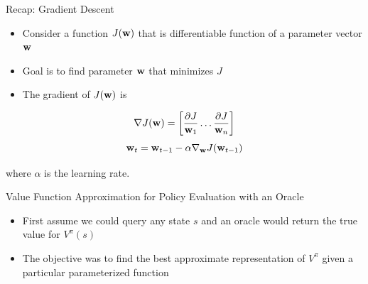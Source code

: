 \documentclass[aspectratio=169]{../latex_main/tntbeamer}  %
\begin{document}
\begin{frame}[c]{Recap: Gradient Descent}
	
	
	\begin{itemize}
		\item Consider a function $J(\mathbf{w})$ that is differentiable function of a parameter vector $\mathbf{w}$
		\item Goal is to find parameter $\mathbf{w}$ that minimizes $J$
		\item The gradient of $J(\mathbf{w})$ is 
	\end{itemize}
	$$
	\nabla J(\mathbf{w}) = \left[ \frac{\partial J}{\mathbf{w}_1} \ldots \frac{\partial J}{\mathbf{w}_n} \right]
	$$
	$$\mathbf{w}_t = \mathbf{w}_{t-1} - \alpha \nabla_{\mathbf{w}} J(\mathbf{w}_{t-1})$$
	
	where $\alpha$ is the learning rate.

	
\end{frame}
\begin{frame}[c]{Value Function Approximation for Policy Evaluation with
		an Oracle}
	
	
	\begin{itemize}
		\item First assume we could query any state $s$ and an \alert{oracle} would return
		the true value for $V^\pi (s)$
		\item The objective was to find the best approximate representation of $V^\pi$
		given a particular parameterized function
	\end{itemize}
	
\end{frame}
\end{document}
